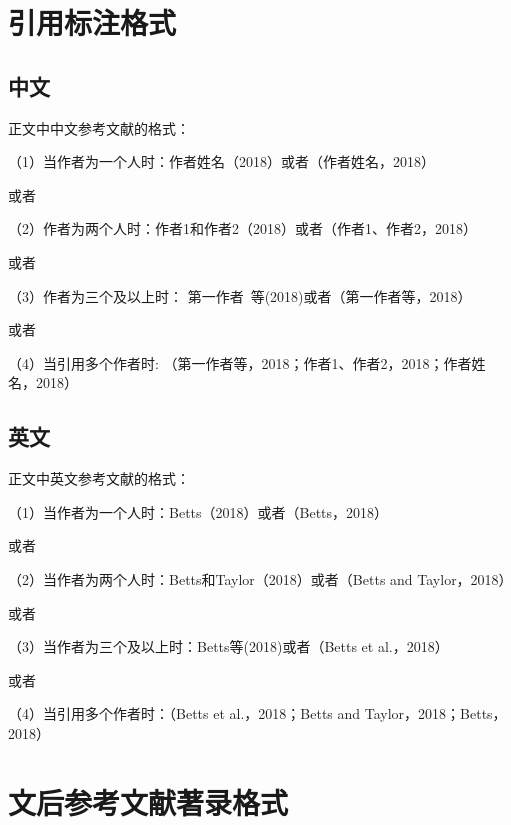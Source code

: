 \documentclass{article}
\begin{document}
\section{引用标注格式}

\subsection{中文}
正文中中文参考文献的格式：

（1）当作者为一个人时：作者姓名（2018）或者（作者姓名，2018）

\citet{戴治勇2014}  或者 \cite{戴治勇2014}

（2）作者为两个人时：作者1和作者2（2018）或者（作者1、作者2，2018）

\citet{林乐2017}  或者 \cite{林乐2017}

（3）作者为三个及以上时： 第一作者\ 等(2018)或者（第一作者等，2018）

\citet{王化成2015}  或者 \cite{王化成2015}


（4）当引用多个作者时: （第一作者等，2018；作者1、作者2，2018；作者姓名，2018）

\cite{高琳2016,佐藤宏2004,黄超2017}

\cite{戴治勇2014,林乐2017,黄超2017}

\subsection{英文}

正文中英文参考文献的格式：

（1）当作者为一个人时：Betts（2018）或者（Betts，2018）

\citet{Weiss2010}  或者 \cite{Weiss2010}

（2）当作者为两个人时：Betts和Taylor（2018）或者（Betts and Taylor，2018）

\citet{Kang2008}  或者 \cite{Kang2008}

（3）当作者为三个及以上时：Betts等(2018)或者（Betts et al.，2018）

\citet{Banker2013}  或者 \cite{Banker2013}


（4）当引用多个作者时：（Betts et al.，2018；Betts and Taylor，2018；Betts，2018）

\cite{Weiss2010,Kang2008,Krugman2006}

\cite{Fama1989,Skolnik1990}



\section{文后参考文献著录格式}
\end{document}
